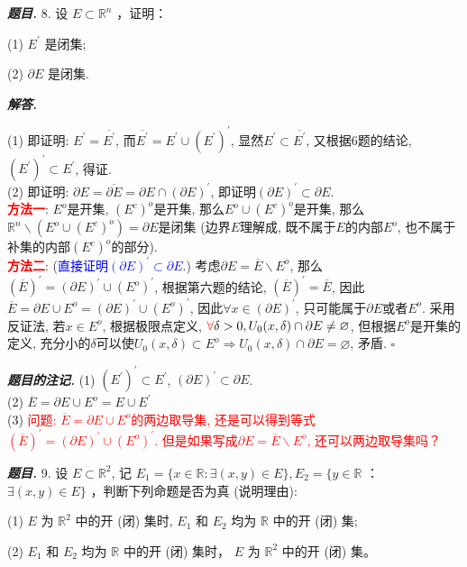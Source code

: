 \documentclass[10pt, a4paper, oneside]{ctexart}
\newenvironment{problem}{\begin{framed}\par\noindent\textbf{\textit{题目. }}}{\end{framed}\par}
\newenvironment{solution}{%
  \par\noindent\textbf{\textit{解答. }}\ignorespaces
}{%
  \hfill\ensuremath{\square}\par %
}
\newenvironment{note}{\par\noindent\textbf{\textit{题目的注记. }}\ignorespaces}{\par}
\begin{document}
\begin{problem}
8. 设 $E \subset \mathbb{R}^n$ ，证明：

(1) $E^{\prime}$ 是闭集;

(2) $\partial E$ 是闭集.
\end{problem}

\begin{solution}
(1) 即证明: $E^{\prime}=\overline{E^{\prime}}$, 而$\overline{E^{\prime}}=E^{\prime}\cup (E^{\prime})^{\prime}$, 显然$E^{\prime}\subset \overline{E^{\prime}}$, 又根据6题的结论, $(E^{\prime})^{\prime}\subset E^{\prime}$, 得证.\\
(2) 即证明: $\partial E = \overline{\partial E}=\partial E\cap (\partial E)^{\prime}$, 即证明$(\partial E)^{\prime}\subset \partial E$.\\
\textbf{\textcolor{red}{方法一}}: $E^{o}$是开集, $(E^{c})^{o}$是开集, 那么$E^{o}\cup (E^{c})^{o}$是开集, 那么$\mathbb{R}^n \backslash (E^{o}\cup (E^{c})^{o}) = \partial E$是闭集 (边界$E$理解成, 既不属于$E$的内部$E^{o}$, 也不属于补集的内部$(E^{c})^{o}$的部分).\\
\textbf{\textcolor{red}{方法二}}: (\textcolor{blue}{直接证明$(\partial E)^{\prime}\subset \partial E$.}) 考虑$\partial E=\overline{E}\backslash E^{o}$, 那么$(\overline{E})^{\prime}=(\partial E)^{\prime}\cup (E^{o})^{\prime}$, 根据第六题的结论, $(\overline{E})^{\prime}=\overline{E}$, 因此$\overline{E}=\partial E \cup E^{o}= (\partial E)^{\prime}\cup (E^{o})^{\prime}$, 因此$\forall x\in (\partial E)^{\prime}$, 只可能属于$\partial E$或者$E^{o}$. 采用反证法, 若$x\in E^{o}$, 根据极限点定义, $\textcolor{red}{\forall} \delta>0, U_0(x,\delta)\cap \partial E\neq \varnothing$, 但根据$E^{o}$是开集的定义, 充分小的$\delta$可以使$U_0(x,\delta)\subset E^{o}\Rightarrow U_0(x,\delta)\cap \partial E=\varnothing$, 矛盾. 
\end{solution}
\begin{note}
    (1) $(E^{\prime})^{\prime}\subset E^{\prime}$, $(\partial E)^{\prime}\subset \partial E$.\\
    (2) $\overline{E}=\partial E\cup E^{o} = E\cup E^{\prime}$\\
    (3) \textcolor{red}{问题: $\overline{E}=\partial E\cup E^{o} $的两边取导集, 还是可以得到等式$(\overline{E})^{\prime}=(\partial E)^{\prime}\cup (E^{o})^{\prime}$. 但是如果写成$\partial E=\overline{E}\backslash E^{o}$, 还可以两边取导集吗？}
\end{note}

\begin{problem}
9. 设 $E \subset \mathbb{R}^2$, 记 $E_1=\{x \in \mathbb{R}: \exists(x, y) \in E\}, E_2=\{y \in \mathbb{R}$ ： $\exists(x, y) \in E\}$ ，判断下列命题是否为真 (说明理由):

(1) $E$ 为 $\mathbb{R}^2$ 中的开 (闭) 集时, $E_1$ 和 $E_2$ 均为 $\mathbb{R}$ 中的开 (闭) 集;

(2) $E_1$ 和 $E_2$ 均为 $\mathbb{R}$ 中的开 (闭) 集时， $E$ 为 $\mathbb{R}^2$ 中的开 (闭) 集。
\end{problem}
\end{document}
